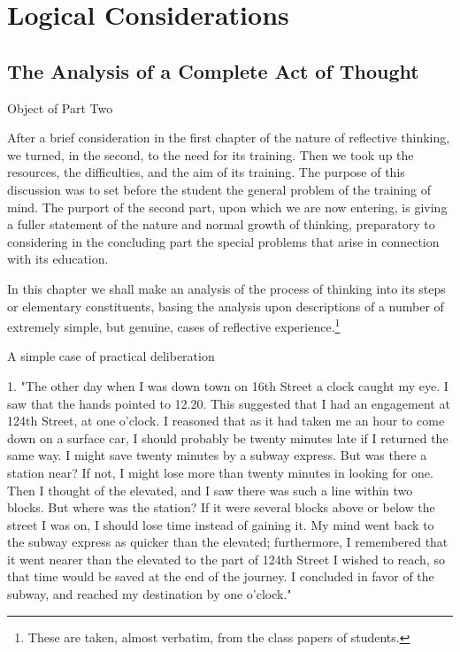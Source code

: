 \documentclass[letterpaper]{book}
\begin{document}
\part{Logical Considerations}

\chapter{The Analysis of a Complete Act of Thought}

Object of Part Two

After a brief consideration in the first chapter of the nature of
reflective thinking, we turned, in the second, to the need for its
training. Then we took up the resources, the difficulties, and the aim
of its training. The purpose of this discussion was to set before the
student the general problem of the training of mind. The purport of the
second part, upon which we are now entering, is giving a fuller
statement of the nature and normal growth of thinking, preparatory to
considering in the concluding part the special problems that arise in
connection with its education.

In this chapter we shall make an analysis of the process of thinking
into its steps or elementary constituents, basing the analysis upon
descriptions of a number of extremely simple, but genuine, cases of
reflective
experience.\footnote{
These are taken, almost verbatim, from the class papers of students.
}

A simple case of practical deliberation

1. "The other day when I was down town on 16th Street a clock caught my
eye. I saw that the hands pointed to 12.20. This suggested that I had an
engagement at 124th Street, at one o'clock. I reasoned
that
as it had taken me an hour to come down on a surface car, I should
probably be twenty minutes late if I returned the same way. I might save
twenty minutes by a subway express. But was there a station near? If
not, I might lose more than twenty minutes in looking for one. Then I
thought of the elevated, and I saw there was such a line within two
blocks. But where was the station? If it were several blocks above or
below the street I was on, I should lose time instead of gaining it. My
mind went back to the subway express as quicker than the elevated;
furthermore, I remembered that it went nearer than the elevated to the
part of 124th Street I wished to reach, so that time would be saved at
the end of the journey. I concluded in favor of the subway, and reached
my destination by one o'clock."
\end{document}
